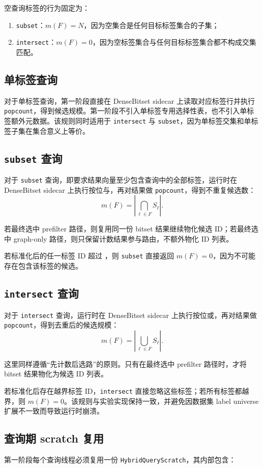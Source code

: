 \documentclass[UTF8]{ctexart}
\begin{document}
空查询标签的行为固定为：

\begin{enumerate}
\item \texttt{subset}：\(m(F)=N\)，因为空集合是任何目标标签集合的子集；
\item \texttt{intersect}：\(m(F)=0\)，因为空标签集合与任何目标标签集合都不构成交集匹配。
\end{enumerate}

\subsection{单标签查询}
对于单标签查询，第一阶段直接在 DenseBitset sidecar 上读取对应标签行并执行 \texttt{popcount}，得到候选规模。第一阶段不引入单标签专用选择性表，也不引入单标签额外元数据。该规则同时适用于 \texttt{intersect} 与 \texttt{subset}，因为单标签交集和单标签子集在集合意义上等价。

\subsection{\texttt{subset} 查询}
对于 \texttt{subset} 查询，即要求结果向量至少包含查询中的全部标签，运行时在 DenseBitset sidecar 上执行按位与，再对结果做 \texttt{popcount}，得到不重复候选数：
\[
m(F)=\left|\bigcap_{\ell \in F} S_{\ell}\right|.
\]

若最终选中 prefilter 路径，则复用同一份 bitset 结果继续物化候选 ID；若最终选中 graph-only 路径，则只保留计数结果参与路由，不额外物化 ID 列表。

若标准化后的任一标签 ID 超过 ，则 \texttt{subset} 直接返回 \(m(F)=0\)，因为不可能存在包含该标签的候选。

\subsection{\texttt{intersect} 查询}
对于 \texttt{intersect} 查询，运行时在 DenseBitset sidecar 上执行按位或，再对结果做 \texttt{popcount}，得到去重后的候选规模：
\[
m(F)=\left|\bigcup_{\ell \in F} S_{\ell}\right|.
\]

这里同样遵循“先计数后选路”的原则。只有在最终选中 prefilter 路径时，才将 bitset 结果物化为候选 ID 列表。

若标准化后存在越界标签 ID，\texttt{intersect} 直接忽略这些标签；若所有标签都越界，则 \(m(F)=0\)。该规则与实验实现保持一致，并避免因数据集 label universe 扩展不一致而导致运行时崩溃。

\subsection{查询期 scratch 复用}
第一阶段每个查询线程必须复用一份 \texttt{HybridQueryScratch}，其内部包含：
\end{document}
